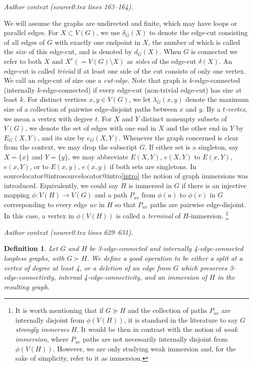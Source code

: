 \documentclass[10pt,a4paper]{amsart}
\makeatletter
\newtheorem{definition}{Definition}
\let\originalcref\cref
\renewcommand{\cref}[1]{\ifcsname sourcelocator@#1\endcsname\csname sourcelocator@#1\endcsname\else\originalcref{#1}\fi}
\makeatother
\begin{document}
\par\medskip\noindent\textit{Author context (source0.tex lines 163--164).}\par\smallskip
We will assume the graphs are undirected and finite, which may have loops or parallel edges. For $X\subset V(G)$, we use $\delta_G(X)$ to denote the edge-cut consisting of all edges of $G$ with exactly one endpoint in $X$, the number of which is called the \emph{size} of this edge-cut, and is denoted by $d_G(X)$. When $G$ is connected we refer to both $X$ and $X^c (=V(G)\setminus X)$ as \emph{sides} of the edge-cut $\delta (X)$. An edge-cut is called \emph{trivial} if at least one side of the cut consists of only one vertex. We call an edge-cut of size one a \emph{cut-edge}. Note that graph is $k$-edge-connected (internally $k$-edge-connected) if every edge-cut (non-trivial edge-cut) has size at least $k$. For distinct vertices $x, y \in V(G)$, we let $\lambda_G({x,y})$ denote the maximum size of a collection of pairwise edge-disjoint paths between $x$ and $y$. By a \emph{$t$-vertex}, we mean a vertex with degree $t$. For $X$ and $Y$ distinct nonempty subsets of $V(G)$, we denote the set of edges with one end in $X$ and the other end in $Y$ by $E_G(X, Y)$, and its size by $e_G(X, Y)$. Whenever the graph concerned is clear from the context, we may drop the subscript $G$. If either set is a singleton, say \( X = \{x\} \) and \( Y = \{y\} \), we may abbreviate \( E(X, Y) \), \( e(X, Y) \) to \( E(x, Y) \), \( e(x, Y) \), or to \( E(x, y) \), \( e(x, y) \) if both sets are singletons. 
 In \cref{intro} the notion of graph immersions was introduced. Equivalently, we could say $H$ is immersed in $G$ if there is an injective mapping $\phi:V(H) \rightarrow V(G)$ and a path $P_{uv}$ from $\phi(u)$ to $\phi(v)$  in $G$ corresponding to every edge $uv$ in $H$ so that $P_{uv}$ paths are pairwise edge-disjoint. In this case, a vertex in $\phi(V(H))$ is called a \emph{terminal} of $H$-immersion. \footnote{It is worth mentioning that if $G\succeq H$ and the collection of paths $P_{uv}$ are internally disjoint from $\phi(V(H))$, it is standard in the literature to say $G$ \emph{strongly immerses} $H$. It would be then in contrast with the notion of \emph{weak immersion}, where $P_{uv}$ paths are not necessarily internally disjoint from $\phi(V(H))$. However, we are only studying weak immersion and, for the sake of simplicity, refer to it as immersion.}
\par\medskip\noindent\textit{Author context (source0.tex lines 629--631).}\par\smallskip
\begin{definition}
Let $G$ and $H$ be 3-edge-connected and internally 4-edge-connected loopless graphs, with $G \succ H$. We define a \emph{good operation} to be either a split at a vertex of degree at least 4, or a deletion of an edge from $G$ which preserves 3-edge-connectivity, internal 4-edge-connectivity, and an immersion of $H$ in the resulting graph.
\end{definition}
\end{document}
